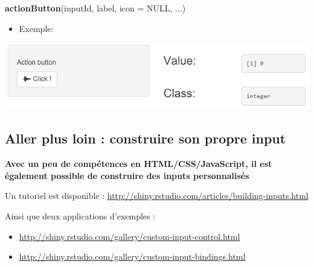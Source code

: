 \documentclass[]{article}
\newenvironment{Shaded}{\begin{snugshade}}{\end{snugshade}}
\newcommand{\KeywordTok}[1]{\textcolor[rgb]{0.13,0.29,0.53}{\textbf{#1}}}
\newcommand{\DataTypeTok}[1]{\textcolor[rgb]{0.13,0.29,0.53}{#1}}
\newcommand{\StringTok}[1]{\textcolor[rgb]{0.31,0.60,0.02}{#1}}
\newcommand{\CommentTok}[1]{\textcolor[rgb]{0.56,0.35,0.01}{\textit{#1}}}
\newcommand{\OtherTok}[1]{\textcolor[rgb]{0.56,0.35,0.01}{#1}}
\newcommand{\NormalTok}[1]{#1}
\providecommand{\tightlist}{%
  \setlength{\itemsep}{0pt}\setlength{\parskip}{0pt}}
\begin{document}
\begin{Shaded}
\begin{Highlighting}[]
\KeywordTok{actionButton}\NormalTok{(inputId, label, }\DataTypeTok{icon =} \OtherTok{NULL}\NormalTok{, ...)}
\end{Highlighting}
\end{Shaded}

\begin{itemize}
\tightlist
\item
  Exemple:
\end{itemize}

\begin{Shaded}
\end{Shaded}

\includegraphics{img/action.png}

\subsection{Aller plus loin : construire son propre
input}\label{aller-plus-loin-construire-son-propre-input}

\textbf{Avec un peu de compétences en HTML/CSS/JavaScript, il est
également possible de construire des inputs personnalisés}

Un tutoriel est disponible :
\url{http://shiny.rstudio.com/articles/building-inputs.html}

Ainsi que deux applications d'exemples :

\begin{itemize}
\item
  \url{http://shiny.rstudio.com/gallery/custom-input-control.html}
\item
  \url{http://shiny.rstudio.com/gallery/custom-input-bindings.html}
\end{itemize}
\end{document}
